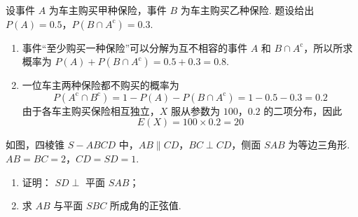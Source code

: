 \begin{solution}
设事件 \(A\) 为车主购买甲种保险，事件 \(B\) 为车主购买乙种保险. 题设给出 \(P(A)=0.5\)，\(P(B\cap A^{\mathrm c})=0.3\).

\begin{enumerate}
\item 事件“至少购买一种保险”可以分解为互不相容的事件 \(A\) 和 \(B\cap A^{\mathrm c}\)，所以所求概率为 \(P(A)+P(B\cap A^{\mathrm c})=0.5+0.3=0.8\).

\item 一位车主两种保险都不购买的概率为
\[
P(A^{\mathrm c}\cap B^{\mathrm c})=1-P(A)-P(B\cap A^{\mathrm c})=1-0.5-0.3=0.2
\]
由于各车主购买保险相互独立，\(X\) 服从参数为 \(100\)，\(0.2\) 的二项分布，因此
\[
E(X)=100\times0.2=20
\]
\end{enumerate}
\end{solution}


\begin{problem}
如图，四棱锥 \(S - ABCD\) 中，\(AB \parallel CD\)，\(BC \perp CD\)，侧面 \(SAB\) 为等边三角形. \(AB = BC = 2\)，\(CD = SD = 1\).
\begin{enumerate}
\item 证明： \(SD \perp\) 平面 \(SAB\)；
\item 求 \(AB\) 与平面 \(SBC\) 所成角的正弦值.
\end{enumerate}
\end{problem}

